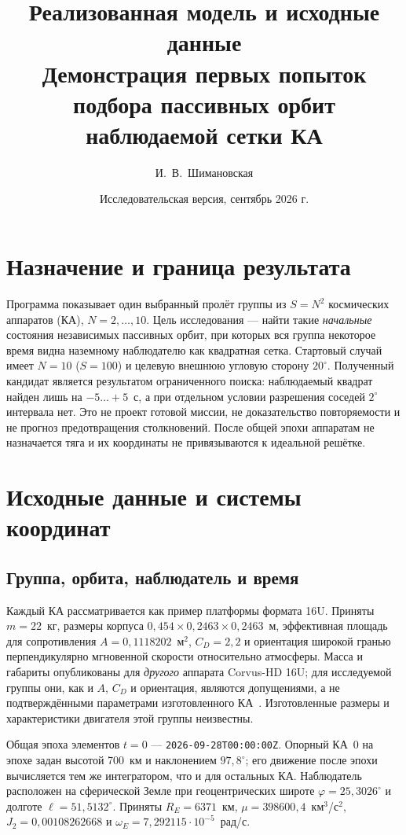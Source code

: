 \documentclass[a4paper,12pt]{article}
\title{Реализованная модель и исходные данные\\
  \large Демонстрация первых попыток подбора пассивных орбит наблюдаемой сетки КА}
\author{И.~В.~Шимановская}
\date{Исследовательская версия, сентябрь 2026 г.}
\begin{document}
\justifying
\maketitle

\section{Назначение и граница результата}

Программа показывает один выбранный пролёт группы из $S=N^2$ космических
аппаратов (КА), $N=2,\ldots,10$. Цель исследования --- найти такие
\emph{начальные} состояния независимых пассивных орбит, при которых
вся группа некоторое время видна наземному наблюдателю как квадратная
сетка. Стартовый случай имеет $N=10$ ($S=100$) и целевую внешнюю
угловую сторону $20^\circ$. Полученный кандидат является
результатом ограниченного поиска: наблюдаемый квадрат найден лишь
на $-5\ldots+5$~с, а при отдельном условии разрешения соседей
$2^\circ$ интервала нет. Это не проект готовой миссии,
не доказательство повторяемости и не прогноз предотвращения столкновений.
После общей эпохи аппаратам не назначается тяга и их координаты
не привязываются к идеальной решётке.

\section{Исходные данные и системы координат}

\subsection{Группа, орбита, наблюдатель и время}

Каждый КА рассматривается как пример платформы формата 16U.
Приняты $m=22$~кг, размеры корпуса
$0{,}454\times0{,}2463\times0{,}2463$~м,
эффективная площадь для сопротивления $A=0{,}1118202$~м$^2$,
$C_D=2{,}2$ и ориентация широкой гранью перпендикулярно мгновенной
скорости относительно атмосферы. Масса и габариты опубликованы для
\emph{другого} аппарата Corvus-HD 16U; для исследуемой группы они,
как и $A$, $C_D$ и ориентация, являются допущениями, а не
подтверждёнными параметрами изготовленного КА~\cite{corvus}.
Изготовленные размеры и характеристики двигателя этой группы неизвестны.

Общая эпоха элементов $t=0$ --- \texttt{2026-09-28T00:00:00Z}.
Опорный КА~0 на эпохе задан высотой 700~км и наклонением
$97{,}8^\circ$; его движение после эпохи вычисляется тем же
интегратором, что и для остальных КА. Наблюдатель расположен на
сферической Земле при геоцентрических широте
$\varphi=25{,}3026^\circ$ и долготе $\ell=51{,}5132^\circ$.
Приняты $R_E=6371$~км, $\mu=398600{,}4$~км$^3$/с$^2$,
$J_2=0{,}00108262668$ и
$\omega_E=7{,}292115\cdot10^{-5}$~рад/с.
\end{document}
